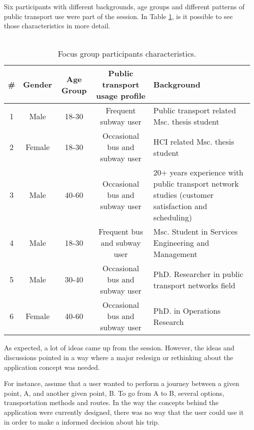 Six participants with different backgrounds, age groups and different patterns of public transport use were part of the session. In Table \ref{tab:table1}, is it possible to see those characteristics in more detail. \\ \\



\begin{table}[H]

\begin{center}
\begin{tabular}{ c c c c p{5cm} }

  \hline 
  \textbf{\#} & \textbf{Gender} & \textbf{Age Group} & \textbf{Public transport usage profile} & \textbf{Background} \\
  \hline 
  1 & Male & 18-30 & Frequent subway user & Public transport related Msc. thesis
   student \\
  \hline
  2 & Female & 18-30 & Occasional bus and subway user & HCI related Msc. thesis student \\
  \hline
  3 & Male & 40-60 & Occasional bus and subway user & 20+ years experience with public transport
  network studies (customer satisfaction
   and scheduling) \\ 
  \hline
  4 & Male & 18-30 & Frequent bus and subway user & Msc. Student in Services Engineering
   and Management\\
  \hline
  5 & Male & 30-40 & Occasional bus and subway user & PhD. Researcher in public transport
   networks field\\
  \hline
  6 & Female & 40-60 & Occasional bus and subway user & PhD. in Operations Research\\
  \hline
\end{tabular}
\caption{Focus group participants characteristics.}
\label{tab:table1}
\end{center}
\end{table}

As expected, a lot of ideas came up from the session. However, the ideas and discussions pointed in a way where a major redesign or rethinking about the application concept was needed.

For instance, assume that a user wanted to perform a journey between a given point, A, and another given point, B. To go from A to B, several options, transportation methods and routes. In the way the concepts behind the application were currently designed, there was no way that the user could use it in order to make a informed decision about his trip. 

